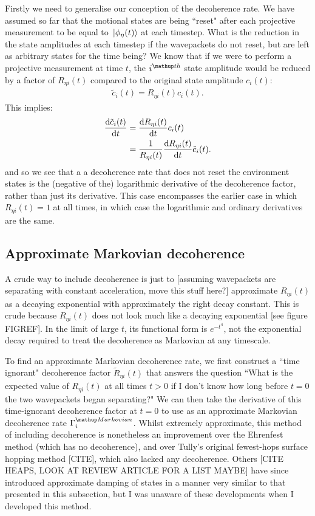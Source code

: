 Firstly we need to generalise our conception of the decoherence rate. We have assumed so far that the motional states are being ``reset" after each projective measurement to be equal to $\ket{\phi_\eta(t)}$ at each timestep. What is the reduction in the state amplitudes at each timestep if the wavepackets do not reset, but are left as arbitrary states for the time being? We know that if we were to perform a projective measurement at time $t$, the $i^\up{th}$ state amplitude would be reduced by a factor of $R_{\eta i}(t)$ compared to the original state amplitude $c_i(t)$:
\begin{align}
\tilde c_i(t) = R_{\eta i}(t) c_i(t).
\end{align}
This implies:
\begin{align}
\dv{\tilde c_i(t)}{t} &= \dv{R_{\eta i}(t)}{t} c_i(t)\\
&= \frac1{R_{\eta i}(t)}\dv{R_{\eta i}(t)}{t} \tilde c_i(t).
\end{align}
and so we see that a a decoherence rate that does not reset the environment states is the (negative of the) logarithmic derivative of the decoherence factor, rather than just its derivative. This case encompasses the earlier case in which $R_{\eta i}(t) = 1$ at all times, in which case the logarithmic and ordinary derivatives are the same.

\subsection{Approximate Markovian decoherence}

A crude way to include decoherence is just to [assuming wavepackets are separating with constant acceleration, move this stuff here?] approximate $R_{\eta i}(t)$ as a decaying exponential with approximately the right decay constant. This is crude because $R_{\eta i}(t)$ does not look much like a decaying exponential [see figure FIGREF]. In the limit of large $t$, its functional form is $e^{-t^4}$, not the exponential decay required to treat the decoherence as Markovian at any timescale.

To find an approximate Markovian decoherence rate, we first construct a ``time ignorant" decoherence factor $\tilde R_{\eta i}(t)$ that answers the question ``What is the expected value of $R_{\eta i}(t)$ at all times $t > 0$ if I don't know how long before $t=0$ the two wavepackets began separating?" We can then take the derivative of this time-ignorant decoherence factor at $t=0$ to use as an approximate Markovian decoherence rate $\Gamma^\up{Markovian}_i$. Whilst extremely approximate, this method of including decoherence is nonetheless an improvement over the Ehrenfest method (which has no decoherence), and over Tully's original fewest-hops surface hopping method [CITE], which also lacked any decoherence. Others [CITE HEAPS, LOOK AT REVIEW ARTICLE FOR A LIST MAYBE] have since introduced approximate damping of states in a manner very similar to that presented in this subsection, but I was unaware of these developments when I developed this method.

